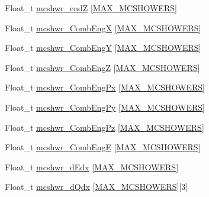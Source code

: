 \begin{DoxyCompactItemize}
\item 
Float\-\_\-t \hyperlink{classanatree_a22de11d80e524b325e90f9f088ee8f78}{mcshwr\-\_\-end\-Z} \mbox{[}\hyperlink{anatree__core__v09410002_8h_ac14fc9ac3bf074dc1c2ab53cbd26449b}{M\-A\-X\-\_\-\-M\-C\-S\-H\-O\-W\-E\-R\-S}\mbox{]}
\item 
Float\-\_\-t \hyperlink{classanatree_abbb6d449c7ad4a5958b98b4b14c054c9}{mcshwr\-\_\-\-Comb\-Eng\-X} \mbox{[}\hyperlink{anatree__core__v09410002_8h_ac14fc9ac3bf074dc1c2ab53cbd26449b}{M\-A\-X\-\_\-\-M\-C\-S\-H\-O\-W\-E\-R\-S}\mbox{]}
\item 
Float\-\_\-t \hyperlink{classanatree_a6a681d36de3242f394d61525b4ea86bc}{mcshwr\-\_\-\-Comb\-Eng\-Y} \mbox{[}\hyperlink{anatree__core__v09410002_8h_ac14fc9ac3bf074dc1c2ab53cbd26449b}{M\-A\-X\-\_\-\-M\-C\-S\-H\-O\-W\-E\-R\-S}\mbox{]}
\item 
Float\-\_\-t \hyperlink{classanatree_a298eb17e7f12ff46759105692774ee46}{mcshwr\-\_\-\-Comb\-Eng\-Z} \mbox{[}\hyperlink{anatree__core__v09410002_8h_ac14fc9ac3bf074dc1c2ab53cbd26449b}{M\-A\-X\-\_\-\-M\-C\-S\-H\-O\-W\-E\-R\-S}\mbox{]}
\item 
Float\-\_\-t \hyperlink{classanatree_a6b3cba5a8002fc1787421c3dcf1b570c}{mcshwr\-\_\-\-Comb\-Eng\-Px} \mbox{[}\hyperlink{anatree__core__v09410002_8h_ac14fc9ac3bf074dc1c2ab53cbd26449b}{M\-A\-X\-\_\-\-M\-C\-S\-H\-O\-W\-E\-R\-S}\mbox{]}
\item 
Float\-\_\-t \hyperlink{classanatree_a7194ab092992723689ed99271cb71dde}{mcshwr\-\_\-\-Comb\-Eng\-Py} \mbox{[}\hyperlink{anatree__core__v09410002_8h_ac14fc9ac3bf074dc1c2ab53cbd26449b}{M\-A\-X\-\_\-\-M\-C\-S\-H\-O\-W\-E\-R\-S}\mbox{]}
\item 
Float\-\_\-t \hyperlink{classanatree_a056d2fbc44ed6254ac8c99f4a8d86292}{mcshwr\-\_\-\-Comb\-Eng\-Pz} \mbox{[}\hyperlink{anatree__core__v09410002_8h_ac14fc9ac3bf074dc1c2ab53cbd26449b}{M\-A\-X\-\_\-\-M\-C\-S\-H\-O\-W\-E\-R\-S}\mbox{]}
\item 
Float\-\_\-t \hyperlink{classanatree_a3645165a09eb07670cad8e58bde4642a}{mcshwr\-\_\-\-Comb\-Eng\-E} \mbox{[}\hyperlink{anatree__core__v09410002_8h_ac14fc9ac3bf074dc1c2ab53cbd26449b}{M\-A\-X\-\_\-\-M\-C\-S\-H\-O\-W\-E\-R\-S}\mbox{]}
\item 
Float\-\_\-t \hyperlink{classanatree_a8b5049f77950471b1493c2cad77865ad}{mcshwr\-\_\-d\-Edx} \mbox{[}\hyperlink{anatree__core__v09410002_8h_ac14fc9ac3bf074dc1c2ab53cbd26449b}{M\-A\-X\-\_\-\-M\-C\-S\-H\-O\-W\-E\-R\-S}\mbox{]}
\item 
Float\-\_\-t \hyperlink{classanatree_a38d5daa121304fe999a4dd80d6b0e121}{mcshwr\-\_\-d\-Qdx} \mbox{[}\hyperlink{anatree__core__v09410002_8h_ac14fc9ac3bf074dc1c2ab53cbd26449b}{M\-A\-X\-\_\-\-M\-C\-S\-H\-O\-W\-E\-R\-S}\mbox{]}\mbox{[}3\mbox{]}

\end{DoxyCompactItemize}
